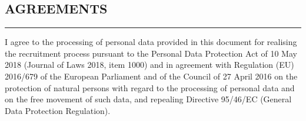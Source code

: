 \documentclass{article}
\begin{document}
\newpage

\subsection*{AGREEMENTS}
\vspace{-1.5em}
\rule{\textwidth}{0.1pt}
I agree to the processing of personal data provided in this document for realising the recruitment process pursuant to the
Personal Data Protection Act of 10 May 2018 (Journal of Laws 2018, item 1000) and in agreement with Regulation (EU)
2016/679 of the European Parliament and of the Council of 27 April 2016 on the protection of natural persons with regard
to the processing of personal data and on the free movement of such data, and repealing Directive 95/46/EC (General
Data Protection Regulation).

\end{document}
